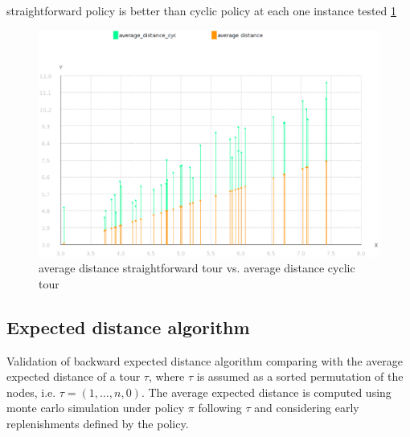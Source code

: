 straightforward policy is better than cyclic policy at each one instance tested \ref{fig:avg_distance_cyclic_vs_avg_distance_forward}

\begin{figure}[!htbp]
  \begin{center}
   \includegraphics[width=1\textwidth]{Images/Chapter5/cyclic_vs_straightforward_avgdistance_n5_n8.eps}
  \end{center}
    \caption{average distance straightforward tour vs. average distance cyclic tour}\label{fig:avg_distance_cyclic_vs_avg_distance_forward}
\end{figure}

\subsection{Expected distance algorithm}\label{sec:test_expecteddistance}

Validation of backward expected distance algorithm comparing with the average expected distance of a tour $\tau$, where $\tau$ is assumed as a sorted permutation of the nodes, i.e. $\tau = (1,\ldots,n,0)$. The average expected distance is computed using monte carlo simulation under policy $\pi$ following $\tau$ and considering early replenishments defined by the policy.

